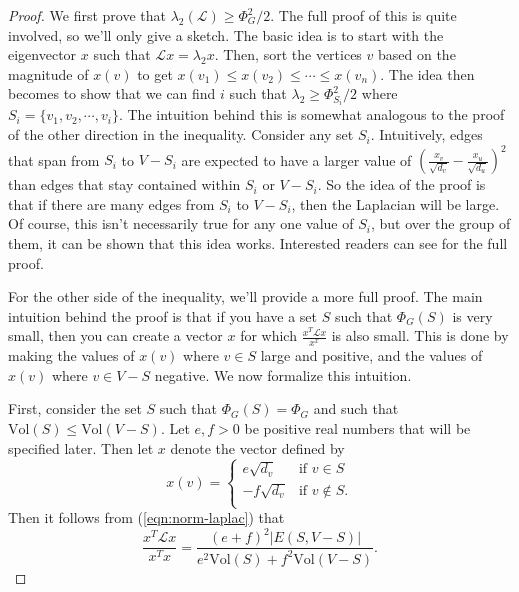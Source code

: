 \documentclass[12pt,twoside]{article}
\begin{document}
\begin{proof}
We first prove that $\lambda_2(\mathcal{L}) \geq \Phi_G^2/2$. The full proof of this is quite involved, so we'll only give a sketch.
    The basic idea is to start with the eigenvector $x$ such that $\mathcal{L}x = \lambda_2x$. Then, sort the vertices $v$ based on the magnitude of $x(v)$ to get $x(v_1) \leq x(v_2) \leq \cdots \leq x(v_n)$. The idea then becomes to show that we can find $i$ such that $\lambda_2 \geq \Phi_{S_i}^2/2$ where $S_i = \{v_1, v_2, \cdots, v_i\}$. The intuition behind this is somewhat analogous to the proof of the other direction in the inequality. Consider any set $S_i$. Intuitively, edges that span from $S_i$ to $V-S_i$ are expected to have a larger value of $(\frac{x_v}{\sqrt{d_v}} - \frac{x_u}{\sqrt{d_u}})^2$ than edges that stay contained within $S_i$ or $V-S_i$. So the idea of the proof is that if there are many edges from $S_i$ to $V-S_i$, then the Laplacian will be large. Of course, this isn't necessarily true for any one value of $S_i$, but over the group of them, it can be shown that this idea works. Interested readers can see \cite{cheeger} for the full proof.

For the other side of the inequality, we'll provide a more full proof. The main intuition behind the proof is that if you have a set $S$ such that $\Phi_G(S)$ is very small, then you can create a vector $x$ for which $\frac{x^T\mathcal{L}x}{x^x}$ is also small. This is done by making the values of $x(v)$ where $v \in S$ large and positive, and the values of $x(v)$ where $v \in V-S$ negative. We now formalize this intuition.

First, consider the set $S$ such that $\Phi_G(S) = \Phi_G$ and such that $\text{Vol}(S) \leq \text{Vol}(V-S)$. Let $e,f > 0$ be positive real numbers that will be specified later. Then let $x$ denote the vector defined by
%
\begin{equation*}
x(v)  = 
            \begin{cases}
                e\sqrt{d_v}     &\mbox{if $v \in S$} \\
                -f\sqrt{d_v}    &\mbox{if $v \notin S$}. \\
            \end{cases}
\end{equation*}
%
Then it follows from (\ref{eqn:norm-laplac}) that
%
\begin{equation*}
\frac{x^T\mathcal{L}x}{x^Tx} = \frac{(e+f)^2|E(S,V-S)|}{e^2\text{Vol}(S) + f^2\text{Vol}(V - S)}.
\end{equation*}


\end{proof}
\end{document}
